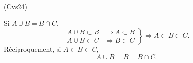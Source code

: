 \begin{tiny}(Cvs24)\end{tiny} Si $A \cup B = B \cap C$,
\[
  \left. 
  \begin{aligned}
    A \cup B \subset B &\Rightarrow A \subset B \\
    A \cup B \subset C &\Rightarrow B \subset C
  \end{aligned}
  \right\rbrace \Rightarrow A \subset B \subset C.
\]
Réciproquement, si $A \subset B \subset C$,
\[
  A \cup B = B = B \cap C.
\]
